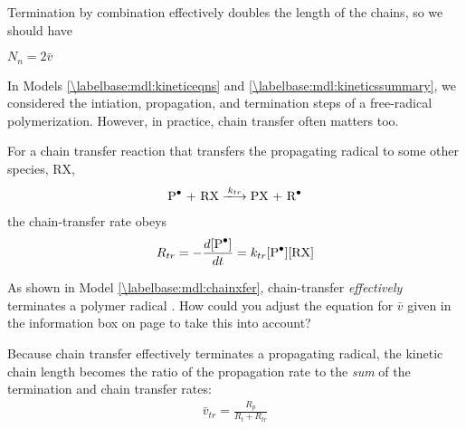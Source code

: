 \begin{activity}
\begin{ctqs}
\begin{enumerate}
				\begin{solution}[0.75in]
					Termination by combination effectively doubles the length of the chains, so we should have 
					
					$N_n = 2\bar v$
				\end{solution}
		
		\end{enumerate}

\end{ctqs}

		
\clearpage
\begin{model}
\label{\labelbase:mdl:chainxfer}

	In Models \ref{\labelbase:mdl:kineticeqns} and \ref{\labelbase:mdl:kineticssummary}, we considered the intiation, propagation, and termination steps of a free-radical polymerization.  However, in practice, chain transfer often matters too.
	
	For a chain transfer reaction that transfers the propagating radical to some other species, RX,
	\begin{align*}
		\text{\ce{P^.} + RX} \xlongrightarrow{k_{tr}} \text{PX + \ce{R^.}}
	\end{align*}
	the chain-transfer rate obeys
	\begin{align*}
		R_{tr} = -\frac{d[\text{\ce{P^.}}]}{dt} = k_{tr}\text{[\ce{P^.}][RX]}
	\end{align*}
	
\end{model}

\begin{ctqs}
	\question As shown in Model \ref{\labelbase:mdl:chainxfer}, chain-transfer \emph{effectively} terminates a polymer radical .
		How could you adjust the equation for $\bar v$ given in the information box on page \pageref{\labelbase:infobox:kineticchainlength} to take this into account?
		
		\begin{solution}[2in]
	
			Because chain transfer effectively terminates a propagating radical, the kinetic chain length becomes the ratio of the propagation rate to the \emph{sum} of the termination and chain transfer rates:
			\begin{align*}
				\bar v_{tr} = \frac{R_p}{R_t + R_{tr}}
			\end{align*}
	
		\end{solution}
		
\end{ctqs}


\end{activity}

